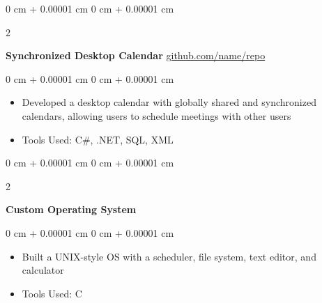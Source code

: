 \documentclass[10pt, letterpaper]{article}
\newenvironment{highlights}{
    \begin{itemize}[
        topsep=0.10 cm,
        parsep=0.10 cm,
        partopsep=0pt,
        itemsep=0pt,
        leftmargin=0 cm + 10pt
    ]
}{
    \end{itemize}
} %
\newenvironment{onecolentry}{
    \begin{adjustwidth}{
        0 cm + 0.00001 cm
    }{
        0 cm + 0.00001 cm
    }
}{
    \end{adjustwidth}
} %
\newenvironment{twocolentry}[2][]{
    \onecolentry
    \def\secondColumn{#2}
    \setcolumnwidth{\fill, 4.5 cm}
    \begin{paracol}{2}
}{
    \switchcolumn \raggedleft \secondColumn
    \end{paracol}
    \endonecolentry
} %
\begin{document}
        \begin{twocolentry}{
            \href{https://github.com/sinaatalay/rendercv}{github.com/name/repo}
        }
            \textbf{Synchronized Desktop Calendar}\end{twocolentry}

        \vspace{0.10 cm}
        \begin{onecolentry}
            \begin{highlights}
                \item Developed a desktop calendar with globally shared and synchronized calendars, allowing users to schedule meetings with other users
                \item Tools Used: C\#, .NET, SQL, XML
            \end{highlights}
        \end{onecolentry}


        \vspace{0.2 cm}

        \begin{twocolentry}{
            2002
        }
            \textbf{Custom Operating System}\end{twocolentry}

        \vspace{0.10 cm}
        \begin{onecolentry}
            \begin{highlights}
                \item Built a UNIX-style OS with a scheduler, file system, text editor, and calculator
                \item Tools Used: C
            \end{highlights}
        \end{onecolentry}



    \vspace{0.2 cm}

    


    
\end{document}
